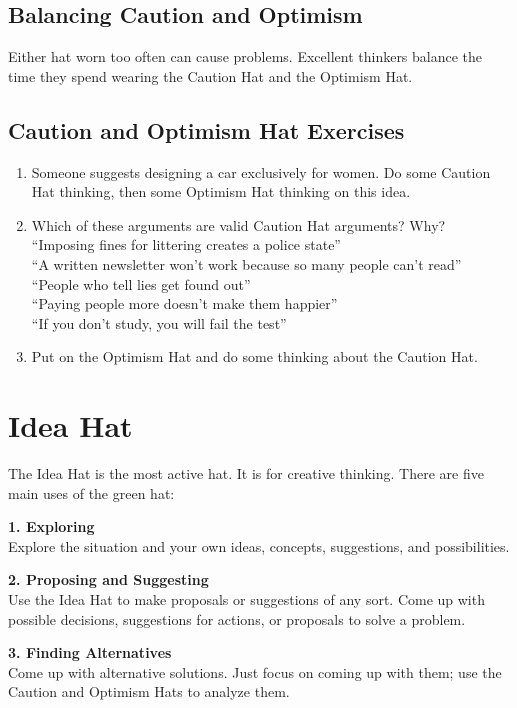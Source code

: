 \subsection*{Balancing Caution and Optimism}
Either hat worn too often can cause problems. Excellent thinkers balance the time they spend wearing the Caution Hat and the Optimism Hat.

\subsection*{Caution and Optimism Hat Exercises}
\begin{enumerate}
	\item Someone suggests designing a car exclusively for women. Do some Caution Hat thinking, then some Optimism Hat thinking on this idea.
	\item Which of these arguments are valid Caution Hat arguments? Why? \\
		``Imposing fines for littering creates a police state'' \\
		``A written newsletter won't work because so many people can't read'' \\
		``People who tell lies get found out'' \\
		``Paying people more doesn't make them happier'' \\
		``If you don't study, you will fail the test''
	\item Put on the Optimism Hat and do some thinking about the Caution Hat.
\end{enumerate}

\section*{Idea Hat}

The Idea Hat is the most active hat. It is for creative thinking. There are five main uses of the green hat:

\textbf{1. Exploring} \\
Explore the situation and your own ideas, concepts, suggestions, and possibilities.

\textbf{2. Proposing and Suggesting} \\
Use the Idea Hat to make proposals or suggestions of any sort. Come up with possible decisions, suggestions for actions, or proposals to solve a problem. 

\textbf{3. Finding Alternatives} \\
Come up with alternative solutions. Just focus on coming up with them; use the Caution and Optimism Hats to analyze them.


